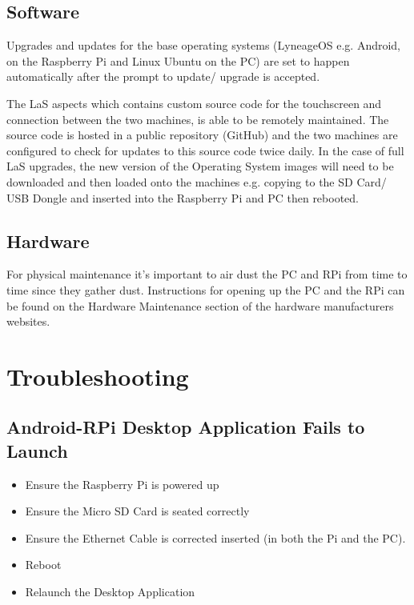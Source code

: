 \documentclass[letterpaper,10pt,openany,oneside,english]{sphinxmanual}
\begin{document}
\subsection{Software}
\label{\detokenize{productmaint:software}}
Upgrades and updates for the base operating systems (LyneageOS e.g. Android, on the Raspberry Pi and Linux Ubuntu on the PC) are set to happen automatically after the prompt to update/ upgrade is accepted.

The LaS aspects which contains custom source code for the touchscreen and connection between the two machines, is able to be remotely maintained. The source code is hosted in a public repository (GitHub) and the two machines are configured to check for updates to this source code twice daily. In the case of full LaS upgrades, the new version of the Operating System images will need to be downloaded and then loaded onto the machines e.g. copying to the SD Card/ USB Dongle and inserted into the Raspberry Pi and PC then rebooted.


\subsection{Hardware}
\label{\detokenize{productmaint:hardware}}
For physical maintenance it’s important to air dust the PC and RPi from time to time since they gather dust.
Instructions for opening up the PC and the RPi can be found on the Hardware Maintenance section of the hardware manufacturers websites.


\section{Troubleshooting}
\label{\detokenize{troubleshooting:troubleshooting}}\label{\detokenize{troubleshooting::doc}}

\subsection{Android-RPi Desktop Application Fails to Launch}
\label{\detokenize{troubleshooting:android-rpi-desktop-application-fails-to-launch}}\begin{itemize}
\item {} 
Ensure the Raspberry Pi is powered up

\item {} 
Ensure the Micro SD Card is seated correctly

\item {} 
Ensure the Ethernet Cable is corrected inserted (in both the Pi and the PC).

\item {} 
Reboot

\item {} 
Relaunch the Desktop Application

\end{itemize}
\end{document}
